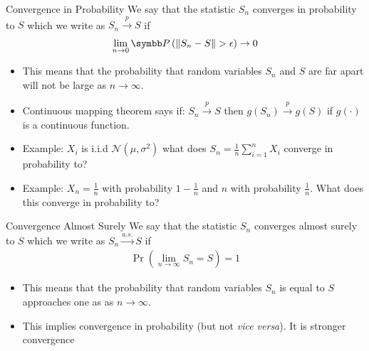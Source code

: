 \documentclass[aspectratio=169,11pt]{beamer}
\begin{document}
\begin{frame}{Convergence in Probability}
We say that the statistic $S_n$ \alert{converges in probability} to $S$ which we write as $S_n \overset{p}{\to} S$ if
\begin{align*}
\lim_{n \rightarrow 0} \Pr \left( \norm{S_n - S} > \epsilon \right) \rightarrow 0
\end{align*}
\begin{itemize}
	\item This means that the \alert{probability} that random variables $S_n$ and $S$ are far apart will not be large as $n\rightarrow \infty$.
	\item Continuous mapping theorem says if: $S_n \overset{p}{\to} S$ then $g(S_n) \overset{p}{\to} g(S)$ if $g(\cdot)$ is a continuous function.
	\item Example: $X_i$ is i.i.d $\mathcal{N}(\mu,\sigma^2)$ what does $S_n = \frac{1}{n} \sum_{i=1}^n X_i$ converge in probability to?
	\item Example: $X_n = \frac{1}{n}$ with probability $1-\frac{1}{n}$ and $n$ with probability $\frac{1}{n}$. What does this converge in probability to?
\end{itemize}
\end{frame}

\begin{frame}{Convergence Almost Surely}
We say that the statistic $S_n$ \alert{converges almost surely} to $S$ which we write as $S_n \overset{a.s.}{\to} S$ if
\begin{align*}
\Pr \left( \lim_{n\rightarrow \infty} S_n = S \right)=1
\end{align*}
\begin{itemize}
	\item This means that the \alert{probability} that random variables $S_n$ is equal to $S$ approaches one as as $n\rightarrow \infty$.
	\item This implies \alert{convergence in probability} (but not \textit{vice versa}). It is \alert{stronger convergence}
\end{itemize}
\end{frame}
\end{document}
